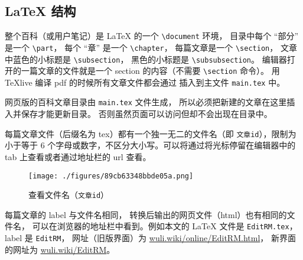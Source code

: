 \subsection{LaTeX 结构}

整个百科（或用户笔记）是 LaTeX 的一个 \verb|\document| 环境， 目录中每个 “部分” 是一个 \verb|\part|， 每个 “章” 是一个 \verb|\chapter|， 每篇文章是一个 \verb|\section|， 文章中蓝色的小标题是 \verb|\subsection|， 黑色的小标题是 \verb|\subsubsection|。 编辑器打开的一篇文章的文件就是一个 section 的内容（不需要 \verb|\section| 命令）。 用 TeXlive 编译 pdf 的时候所有文章文件都会通过 \verb|| 插入到主文件 \verb`main.tex` 中。

网页版的百科文章目录由 \verb|main.tex| 文件生成， 所以必须把新建的文章在这里插入并保存才能更新目录。 否则虽然页面可以访问但却不会出现在目录中。

每篇文章文件（后缀名为 tex）都有一个独一无二的文件名（即 \verb`文章id`），限制为小于等于 6 个字母或数字，不区分大小写。可以将通过将光标停留在编辑器中的 tab 上查看或者通过地址栏的 url 查看。

\begin{figure}[ht]
\centering
\texttt{[image: ./figures/89cb63348bbde05a.png]}
\caption{查看文件名（\verb`文章id`）} \label{fig_editor_2}
\end{figure}

每篇文章的 label 与文件名相同， 转换后输出的网页文件（html）也有相同的文件名， 可以在浏览器的地址栏中看到。例如本文的 LaTeX 文件是 \verb|EditRM.tex|， label 是 \verb|EditRM|， 网址（旧版界面）为 \href{https://wuli.wiki/online/EditRM.html}{wuli.wiki/online/EditRM.html}， 新界面的网址为 \href{https://wuli.wiki/EditRM}{wuli.wiki/EditRM}。

